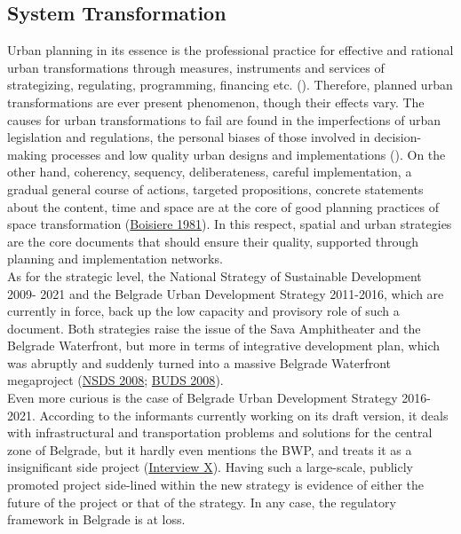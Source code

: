 \documentclass[11pt]{report}
\begin{document}
{{{\subsection{System Transformation}

Urban planning in its essence is the professional practice for effective and rational urban transformations through measures, instruments and services of strategizing, regulating, programming, financing etc.
(\href{Stojkov}{\citealt{stojkov_teorijska_2012}}).
Therefore, planned urban transformations are ever present phenomenon, though their effects vary.
The causes for urban transformations to fail are found in the imperfections  of  urban  legislation  and regulations, the personal biases of those involved in decision-making processes and low quality urban designs and implementations (\href{Grozdanic}{\citealt{grozdanic_belgrade_2008}}).
On the other hand, coherency, sequency, deliberateness, careful implementation, a gradual general course of actions, targeted propositions, concrete statements about the content, time and space are at the core of good planning practices of space transformation (\href{ref}{Boisiere 1981}).
In this respect, spatial and urban strategies are the core documents that should ensure their quality, supported through planning and implementation networks.
\\

As for the strategic level, the National Strategy of Sustainable Development 2009- 2021 and the Belgrade Urban Development Strategy 2011-2016, which are currently in force, back up the low capacity and provisory role of such a document. Both strategies raise the issue of the Sava Amphitheater and the Belgrade Waterfront, but more in terms of integrative development plan, which was abruptly and suddenly turned into a massive Belgrade Waterfront megaproject (\href{NSDS}{NSDS 2008}; \href{BUDS}{BUDS 2008}).
\\

Even more curious is the case of Belgrade Urban Development Strategy 2016-2021.
According to the informants currently working on its draft version, it deals with infrastructural and transportation problems and solutions for the central zone of Belgrade, but it hardly even mentions the BWP, and treats it as a insignificant side project (\href{InterviewX}{Interview X}).
Having such a large-scale, publicly promoted project side-lined within the new strategy is evidence of either the future of the project or that of the strategy. In any case, the regulatory framework in Belgrade is at loss.
\\

}}}
\end{document}
